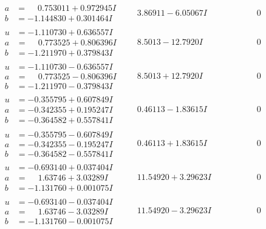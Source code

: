 \documentclass[1p]{elsarticle_modified}
\theoremstyle{definition}
\begin{document}
$$\begin{array}{c|c|c}
\begin{aligned}
a &= \phantom{-}0.753011 + 0.972945 I \\
b &= -1.144830 + 0.301464 I\end{aligned}
 & \phantom{-}3.86911 - 6.05067 I & \phantom{-0.000000 } 0 \\ \hline\begin{aligned}
u &= -1.110730 + 0.636557 I \\
a &= \phantom{-}0.773525 + 0.806396 I \\
b &= -1.211970 + 0.379843 I\end{aligned}
 & \phantom{-}8.5013 - 12.7920 I & \phantom{-0.000000 } 0 \\ \hline\begin{aligned}
u &= -1.110730 - 0.636557 I \\
a &= \phantom{-}0.773525 - 0.806396 I \\
b &= -1.211970 - 0.379843 I\end{aligned}
 & \phantom{-}8.5013 + 12.7920 I & \phantom{-0.000000 } 0 \\ \hline\begin{aligned}
u &= -0.355795 + 0.607849 I \\
a &= -0.342355 + 0.195247 I \\
b &= -0.364582 + 0.557841 I\end{aligned}
 & \phantom{-}0.46113 - 1.83615 I & \phantom{-0.000000 } 0 \\ \hline\begin{aligned}
u &= -0.355795 - 0.607849 I \\
a &= -0.342355 - 0.195247 I \\
b &= -0.364582 - 0.557841 I\end{aligned}
 & \phantom{-}0.46113 + 1.83615 I & \phantom{-0.000000 } 0 \\ \hline\begin{aligned}
u &= -0.693140 + 0.037404 I \\
a &= \phantom{-}1.63746 + 3.03289 I \\
b &= -1.131760 + 0.001075 I\end{aligned}
 & \phantom{-}11.54920 + 3.29623 I & \phantom{-0.000000 } 0 \\ \hline\begin{aligned}
u &= -0.693140 - 0.037404 I \\
a &= \phantom{-}1.63746 - 3.03289 I \\
b &= -1.131760 - 0.001075 I\end{aligned}
 & \phantom{-}11.54920 - 3.29623 I & \phantom{-0.000000 } 0 \\ \hline\begin{aligned}

\end{aligned}
\end{array}$$
\end{document}
